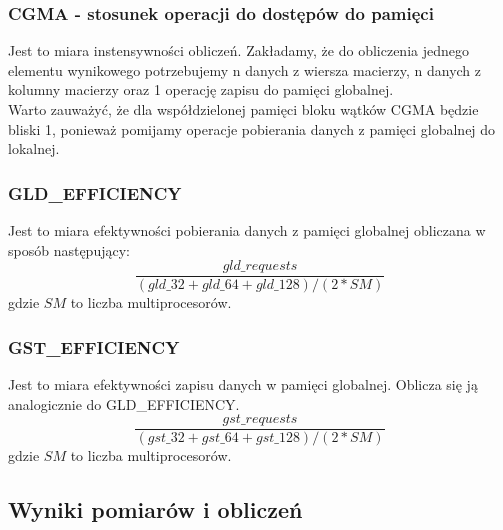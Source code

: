 \documentclass[10pt,a4paper]{article}
\begin{document}
\subsubsection*{CGMA - stosunek operacji do dostępów do pamięci}
Jest to miara instensywności obliczeń. Zakładamy, że do obliczenia jednego elementu
wynikowego potrzebujemy n danych z wiersza macierzy, n danych z kolumny macierzy
oraz 1 operację zapisu do pamięci globalnej.\\
Warto zauważyć, że dla współdzielonej pamięci bloku wątków CGMA będzie bliski 1,
ponieważ pomijamy operacje pobierania danych z pamięci globalnej do lokalnej.


\subsubsection*{GLD\_EFFICIENCY}
Jest to miara efektywności pobierania danych z pamięci globalnej obliczana w sposób
następujący:
\begin{equation}
	\frac{gld\_requests}{(gld\_32 + gld\_64 + gld\_128) / (2*SM)}
\end{equation}
gdzie $SM$ to liczba multiprocesorów.

\subsubsection*{GST\_EFFICIENCY}
Jest to miara efektywności zapisu danych w pamięci globalnej.
Oblicza się ją analogicznie do GLD\_EFFICIENCY.
\begin{equation}
	\frac{gst\_requests}{(gst\_32 + gst\_64 + gst\_128) / (2*SM)}
\end{equation}
gdzie $SM$ to liczba multiprocesorów.

\subsection{Wyniki pomiarów i obliczeń}

\begin{table}
												
												
\end{table}
\end{document}
